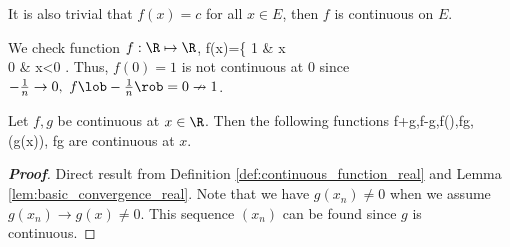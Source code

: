 
\begin{remark}
It is also trivial that $f(x) = c$ for all $x\in E$, then $f$ is continuous on $E$.
\end{remark}

\begin{example}
We check function $f:\R\mapsto\R$,
\be f(x)=\left\{ 1 & x\\ 0 & x<0
\ea \right. \ee
Thus, $f(0)=1$ is not continuous at 0 since $-\frac 1n\to 0,\ f\lob-\frac 1n\rob=0\nrightarrow 1$.
\end{example}




\begin{proposition}\label{pro:basic_continuous_real_property}%
Let $f,g$ be continuous at $x\in \R$. Then the following functions
\be
f+g,\qquad f-g,\qquad \lm f\quad(\lm\in \R),\qquad  fg,\qquad {}\quad(g(x)), \qquad f\circ g
\ee
are continuous at $x$.
\end{proposition}


\begin{proof}[\bf Proof]
Direct result from Definition \ref{def:continuous_function_real} and Lemma \ref{lem:basic_convergence_real}. Note that we have $g(x_n)\neq 0$ when we assume $g(x_n) \to g(x)\neq 0$. This sequence $(x_n)$ can be found since $g$ is continuous.
\end{proof}

